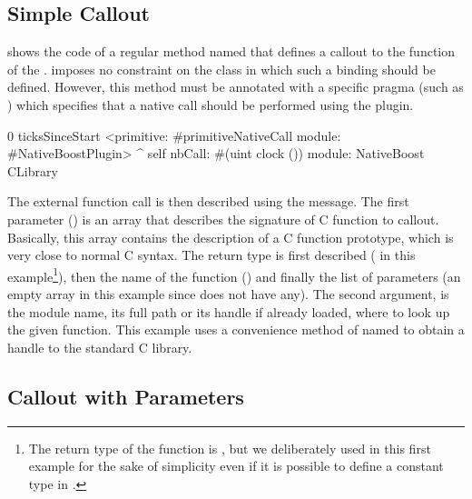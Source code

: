 \subsection{Simple Callout}

 shows the code of a regular \PH method named  that defines a callout to the  function of the .
\NB imposes no constraint on the class in which such a binding should be defined.
However, this method must be annotated with a specific pragma (such as ) which specifies that a native call should be performed using the \NB plugin.

\begin{stcode}[
	label={lst:ffi-clock},
	caption={\NBFFI example of callout declaration to the \ttt{clock} function of the \ttt{libc}}]{0}
ticksSinceStart
	<primitive: #primitiveNativeCall
	 module: #NativeBoostPlugin>
	^ self
		nbCall: #(uint clock ())
		module: NativeBoost CLibrary
\end{stcode}

\noindent The external function call is then described using the  message.
The first parameter () is an array that describes the signature of C function to callout.
Basically, this array contains the description of a C function prototype, which is very close to normal C syntax.
The return type is first described ( in this example\footnote{The return type of the  function is , but we deliberately used  in this first example for the sake of simplicity even if it is possible to define a constant type in \NB.}), then the name of the function () and finally the list of parameters (an empty array in this example since  does not have any).
The second argument,  is the module name, its full path or its handle if already loaded, where to look up the given function.
This example uses a convenience method of \NB named  to obtain a handle to the standard C library.

\subsection{Callout with Parameters}

